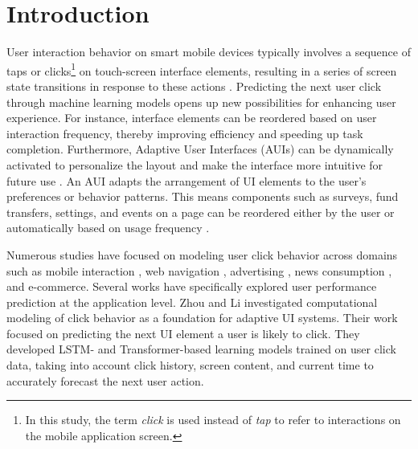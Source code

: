\documentclass[sn-mathphys-num, Numbered]{sn-jnl}%
\theoremstyle{thmstyleone}%
\theoremstyle{thmstyletwo}%
\theoremstyle{thmstylethree}%
\begin{document}
\section{Introduction}

\label{sec:intro}
User interaction behavior on smart mobile devices typically involves a sequence of taps or clicks\footnote{In this study, the term  \textit{click} is used instead of \textit{tap} to refer to interactions on the mobile application screen.} on touch-screen interface elements, resulting in a series of screen state transitions in response to these actions \cite{bohmer2011falling}. Predicting the next user click through machine learning models opens up new possibilities for enhancing user experience. For instance, interface elements can be reordered based on user interaction frequency, thereby improving efficiency and speeding up task completion. Furthermore, Adaptive User Interfaces (AUIs) can be dynamically activated to personalize the layout and make the interface more intuitive for future use \cite{parate2013practical}. An AUI adapts the arrangement of UI elements to the user's preferences or behavior patterns. This means components such as surveys, fund transfers, settings, and events on a page can be reordered either by the user or automatically based on usage frequency \cite{findlater2009ephemeral, tanvir2011improving}.

Numerous studies have focused on modeling user click behavior across domains such as mobile interaction \cite{lee2018click}, web navigation \cite{mao2018constructing}, advertising \cite{liu2015convolutional}, news consumption \cite{wu2019neural}, and e-commerce. Several works \cite{tanvir2011improving, browne2016adaptive, bohmer2011falling} have specifically explored user performance prediction at the application level. Zhou and Li \cite{zhou2021large} investigated computational modeling of click behavior as a foundation for adaptive UI systems. Their work focused on predicting the next UI element a user is likely to click. They developed LSTM- and Transformer-based learning models trained on user click data, taking into account click history, screen content, and current time to accurately forecast the next user action.
\end{document}
